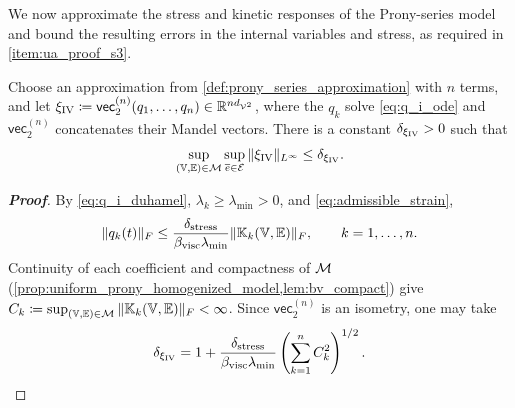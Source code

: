 {
We now approximate the stress and kinetic responses of the Prony-series model and bound the resulting errors in the internal variables and stress, as required in \ref{item:ua_proof_s3}.

\begin{lemma}\label{lem:ua_step3_targets}
{\color{blue}Choose an approximation from \cref{def:prony_series_approximation} with $n$ terms}, and let $\xi_{\rm IV}\coloneqq\mathsf{vec}_2^{(n)}(q_1,\dots,q_n)\in\mathbb{R}^{nd_{{\mathcal{V}}^2}}$, where the $q_k$ solve \cref{eq:q_i_ode} and $\mathsf{vec}_2^{(n)}$ concatenates their Mandel vectors. There is a constant $\delta_{\xi_{\rm IV}}>0$ such that
\begin{equation*}
\sup_{(\mathbb{V},\mathbb{E})\in{\mathcal{M}}}\sup_{\overline e\in{\mathcal{E}}}\|\xi_{\rm IV}\|_{L^\infty}\le\delta_{\xi_{\rm IV}}.
\end{equation*}
\end{lemma}

\begin{proof}[\bf Proof]
By \cref{eq:q_i_duhamel}, $\lambda_k\ge\lambda_{\min}>0$, and \cref{eq:admissible_strain},
\begin{equation*}
\|q_k(t)\|_F\le\frac{\delta_{\rm stress}}{\beta_{\rm visc}\lambda_{\min}}\|\mathbb{K}_k(\mathbb{V},\mathbb{E})\|_F,\qquad k=1,\dots,n.
\end{equation*}
{\color{blue}Continuity of each coefficient and compactness of ${\mathcal{M}}$ (\cref{prop:uniform_prony_homogenized_model,lem:bv_compact}) give $C_k\coloneqq\sup_{(\mathbb{V},\mathbb{E})\in{\mathcal{M}}}\|\mathbb{K}_k(\mathbb{V},\mathbb{E})\|_F<\infty$. Since $\mathsf{vec}_2^{(n)}$ is an isometry, one may take
\begin{equation*}
\delta_{\xi_{\rm IV}}=1+\frac{\delta_{\rm stress}}{\beta_{\rm visc}\lambda_{\min}}\left(\sum_{k=1}^n C_k^2\right)^{1/2}.
\end{equation*}}
\end{proof}
}

